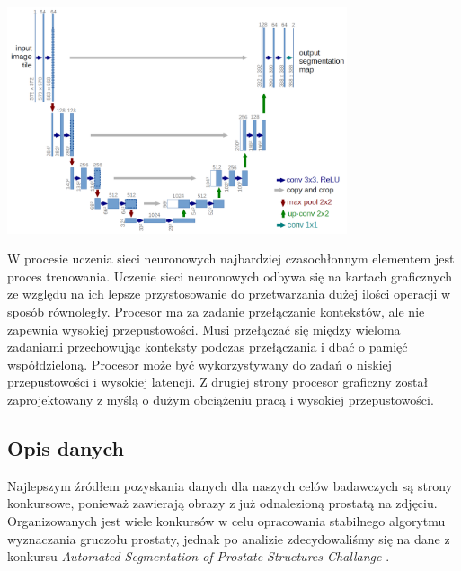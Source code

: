 \documentclass[a4paper,11pt,twoside]{report}
\theoremstyle{definition}
\begin{document}
\begin{minipage}[h]{\linewidth}
	\centering
	\includegraphics[width=10cm]{unet-architecture.png}
\end{minipage}


W procesie uczenia sieci neuronowych najbardziej czasochłonnym elementem jest proces trenowania. Uczenie sieci neuronowych odbywa się na kartach graficznych ze względu na ich lepsze przystosowanie do przetwarzania dużej ilości operacji w sposób równoległy. Procesor ma za zadanie przełączanie kontekstów, ale nie zapewnia wysokiej przepustowości. Musi przełączać się między wieloma zadaniami przechowując konteksty podczas przełączania i dbać o pamięć współdzieloną. Procesor może być wykorzystywany do zadań o niskiej przepustowości i wysokiej latencji. Z drugiej strony procesor graficzny został zaprojektowany z myślą o dużym obciążeniu pracą i wysokiej przepustowości.

\subsection{Opis danych}

Najlepszym źródłem pozyskania danych dla naszych celów badawczych są strony konkursowe, ponieważ zawierają obrazy z już odnalezioną prostatą na zdjęciu. Organizowanych jest wiele konkursów \cite{konkurs} w celu opracowania stabilnego algorytmu wyznaczania gruczołu prostaty, jednak po analizie zdecydowaliśmy się na dane z konkursu \textit{Automated Segmentation of Prostate Structures Challange} \cite{konkretny}.
\end{document}
